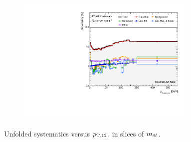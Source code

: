 \begin{figure}[hp]
    \begin{subfigure}{.49\textwidth}\centering\includegraphics[width = 0.95\textwidth]{Figures/m4l/Systematics/Unfolded/UnfoldedSys_pt12_vs_M4l_Stack_Paper3.pdf}\end{subfigure}
    \caption{Unfolded systematics versus $p_{\mathrm{T},12}$, in slices of $m_{4\ell}$.}
\end{figure}

